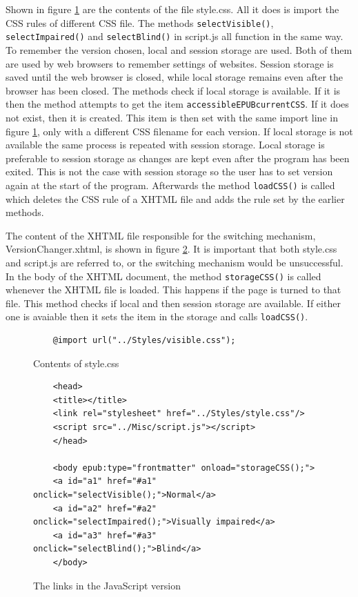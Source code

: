 Shown in figure \ref{fig:jsStyleCss} are the contents of the file style.css. All it does is import the CSS rules of different CSS file. The methods \lstinline|selectVisible()|, \lstinline|selectImpaired()| and \lstinline|selectBlind()| in script.js all function in the same way. To remember the version chosen, local and session storage are used. Both of them are used by web browsers to remember settings of websites. Session storage is saved until the web browser is closed, while local storage remains even after the browser has been closed. The methods check if local storage is available. If it is then the method attempts to get the item \lstinline|accessibleEPUBcurrentCSS|. If it does not exist, then it is created. This item is then set with the same import line in figure \ref{fig:jsStyleCss}, only with a different CSS filename for each version. If local storage is not available the same process is repeated with session storage. Local storage is preferable to session storage as changes are kept even after the program has been exited. This is not the case with session storage so the user has to set version again at the start of the program. Afterwards the method \lstinline|loadCSS()| is called which deletes the CSS rule of a XHTML file and adds the rule set by the earlier methods.

The content of the XHTML file responsible for the switching mechanism, VersionChanger.xhtml, is shown in figure \ref{fig:js_switch}. It is important that both style.css and script.js are referred to, or the switching mechanism would be unsuccessful. In the body of the XHTML document, the method \lstinline{storageCSS()} is called whenever the XHTML file is loaded. This happens if the page is turned to that file. This method checks if local and then session storage are available. If either one is avaiable then it sets the item in the storage and calls \lstinline{loadCSS()}.

\begin{figure}
	
	\begin{lstlisting}
	@import url("../Styles/visible.css");
	\end{lstlisting}
	\caption{Contents of style.css}
	\label{fig:jsStyleCss}
\end{figure}

\begin{figure}
	
	\begin{lstlisting}
	<head>
	<title></title>
	<link rel="stylesheet" href="../Styles/style.css"/>
	<script src="../Misc/script.js"></script>
	</head>
	
	<body epub:type="frontmatter" onload="storageCSS();">
	<a id="a1" href="#a1" onclick="selectVisible();">Normal</a>
	<a id="a2" href="#a2" onclick="selectImpaired();">Visually impaired</a>
	<a id="a3" href="#a3" onclick="selectBlind();">Blind</a>
	</body>
	\end{lstlisting}
	\caption{The links in the JavaScript version}
	\label{fig:js_switch}
\end{figure}

